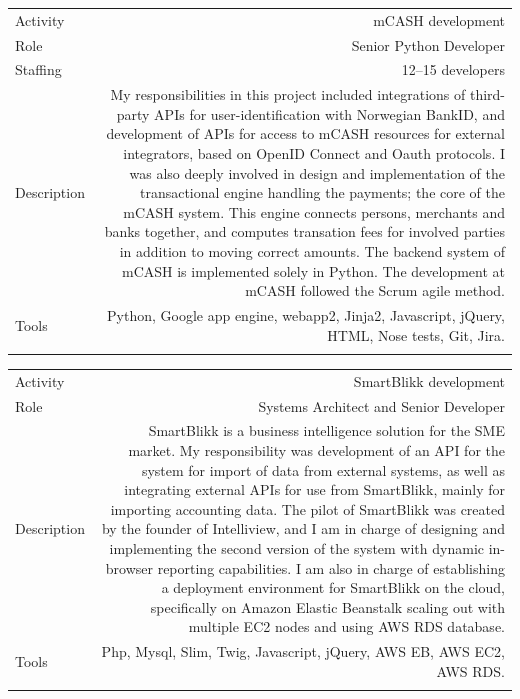 \documentclass[english,a4paper,11pt]{article}
\begin{document}
\begin{tabular}{@{}LR}
Activity & mCASH development\\
Role & Senior Python Developer \\
Staffing & 12--15 developers \\
Description & My responsibilities in this project included integrations of third-party APIs for user-identification with Norwegian BankID, and development of APIs for access to mCASH resources for external integrators, based on OpenID Connect and Oauth protocols. I was also deeply involved in design and implementation of the transactional engine handling the payments; the core of the mCASH system. This engine connects persons, merchants and banks together, and computes transation fees for involved parties in addition to moving correct amounts. The backend system of mCASH is implemented solely in Python. The development at mCASH followed the Scrum agile method.\\
Tools & Python, Google app engine, webapp2, Jinja2, Javascript, jQuery, HTML, Nose tests, Git, Jira. \\ 
\addlinespace \bottomrule[.1pt] \addlinespace
\end{tabular}

\begin{tabular}{@{}LR}
Activity & SmartBlikk development \\
Role & Systems Architect and Senior Developer \\
Description & SmartBlikk is a business intelligence solution for the SME market. My responsibility was development of an API for the system for import of data from external systems, as well as integrating external APIs for use from SmartBlikk, mainly for importing accounting data. The pilot of SmartBlikk was created by the founder of Intelliview, and I am in charge of designing and implementing the second version of the system with dynamic in-browser reporting capabilities. I am also in charge of establishing a deployment environment for SmartBlikk on the cloud, specifically on Amazon Elastic Beanstalk scaling out with multiple EC2 nodes and using AWS RDS database. \\
Tools & Php, Mysql, Slim, Twig, Javascript, jQuery, AWS EB, AWS EC2, AWS RDS. \\ 
\addlinespace \bottomrule[.1pt] \addlinespace
\end{tabular}
\end{document}
